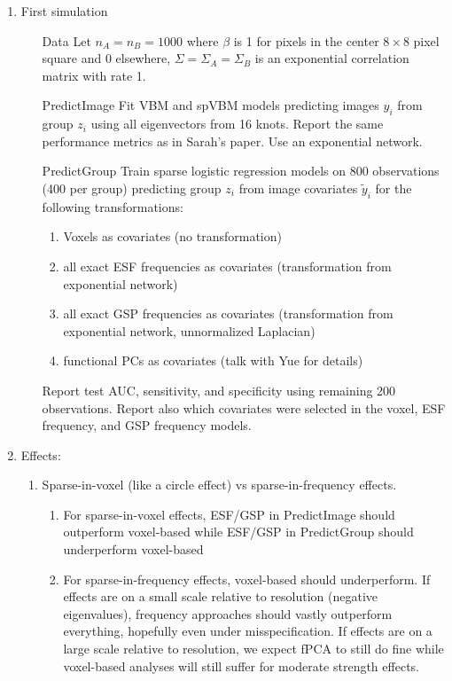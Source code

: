 \documentclass[12pt]{article}
\begin{document}
\begin{enumerate}
	\item First simulation
	\begin{enumerate}
		\item[Data] Let $n_A=n_B=1000$ where $\beta$ is 1 for pixels in the center $8\times8$ pixel square and 0 elsewhere, $\Sigma=\Sigma_A=\Sigma_B$ is an exponential correlation matrix with rate 1. 
		\item[PredictImage] Fit VBM and spVBM models predicting images $y_i$ from group $z_i$ using all eigenvectors from 16 knots. Report the same performance metrics as in Sarah's paper. Use an exponential network.
		\item[PredictGroup] Train sparse logistic regression models on 800 observations (400 per group) predicting group $z_i$ from image covariates $\tilde y_i$ for the following transformations:
		\begin{enumerate}
			\item Voxels as covariates (no transformation)
			\item all exact ESF frequencies as covariates (transformation from exponential network)
			\item all exact GSP frequencies as covariates (transformation from exponential network, unnormalized Laplacian)
			\item functional PCs as covariates (talk with Yue for details)
		\end{enumerate}
		Report test AUC, sensitivity, and specificity using remaining 200 observations. Report also which covariates were selected in the voxel, ESF frequency, and GSP frequency models.
	\end{enumerate}
	\item Effects: 
	\begin{enumerate}
		\item Sparse-in-voxel (like a circle effect) vs sparse-in-frequency effects. 
		\begin{enumerate}
			\item For sparse-in-voxel effects, ESF/GSP in PredictImage should outperform voxel-based while ESF/GSP in PredictGroup should underperform voxel-based
			\item For sparse-in-frequency effects, voxel-based should underperform. If effects are on a small scale relative to resolution (negative eigenvalues), frequency approaches should vastly outperform everything, hopefully even under misspecification. If effects are on a large scale relative to resolution, we expect fPCA to still do fine while voxel-based analyses will still suffer for moderate strength effects.

\end{enumerate}
\end{enumerate}
\end{enumerate}
\end{document}
